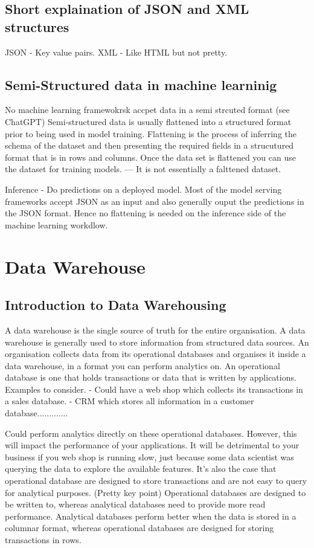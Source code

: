 \documentclass[a4paper, 11pt]{article}
\begin{document}
    \subsection{Short explaination of JSON and XML structures}
    JSON - Key value pairs.
    XML - Like HTML but not pretty.
    
    \subsection{Semi-Structured data in machine learninig}
    No machine learning framewokrsk accpet data in a semi strcuted format (see ChatGPT)
    Semi-structured data is usually flattened into a structured format prior to being used in model training.
    Flattening is the process of inferring the schema of the dataset and then presenting the required fields in a strucutured format that is in rows and columns.
    Once the data set is flattened you can use the dataset for training models.
    --- It is not essentially a falttened dataset.

    Inference
    - Do predictions on a deployed model.
    Most of the model serving frameworks accept JSON as an input and also generally ouput the predictions in the JSON format.
    Hence no flattening is needed on the inference side of the machine learning workdlow.


    \section{Data Warehouse}
    
    \subsection{Introduction to Data Warehousing}
    A data warehouse is the single source of truth for the entire organisation.
    A data warehouse is generally used to store information from structured data sources.
    An organisation collects data from its operational databases and organises it inside a data warehouse, in a format you can perform analytics on.
    An operational database is one that holds transactions or data that is written by applications.
    Examples to consider.
    - Could have a web shop which collects its transactions in a sales database.
    - CRM which stores all information in a customer database.............

    Could perform analytics directly on these operational databases.
    However, this will impact the performance of your applications.
    It will be detrimental to your business if you web shop is running slow, just because some data scientist was querying the data to explore the available features.
    It's also the case that operational database are designed to store transactions and are not easy to query for analytical purposes. (Pretty key point)
    Operational databases are designed to be written to, whereas analytical databases need to provide more read performance.
    Analytical databases perform better when the data is stored in a columnar format, whereas operational databases are designed for storing transactions in rows.
\end{document}
